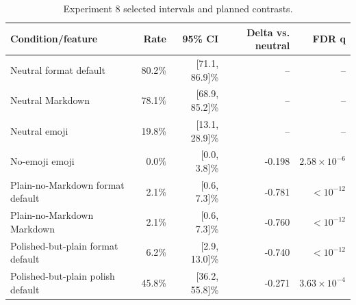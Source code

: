 \begin{table}[t]
\centering
\caption{Experiment 8 selected intervals and planned contrasts.}
\label{tab:exp8-ci-contrast}
\begin{tabular}{lrrrr}
\toprule
Condition/feature & Rate & 95\% CI & Delta vs. neutral & FDR q \\
\midrule
Neutral format default & 80.2\% & [71.1, 86.9]\% & -- & -- \\
Neutral Markdown & 78.1\% & [68.9, 85.2]\% & -- & -- \\
Neutral emoji & 19.8\% & [13.1, 28.9]\% & -- & -- \\
No-emoji emoji & 0.0\% & [0.0, 3.8]\% & -0.198 & $2.58\times10^{-6}$ \\
Plain-no-Markdown format default & 2.1\% & [0.6, 7.3]\% & -0.781 & $<10^{-12}$ \\
Plain-no-Markdown Markdown & 2.1\% & [0.6, 7.3]\% & -0.760 & $<10^{-12}$ \\
Polished-but-plain format default & 6.2\% & [2.9, 13.0]\% & -0.740 & $<10^{-12}$ \\
Polished-but-plain polish default & 45.8\% & [36.2, 55.8]\% & -0.271 & $3.63\times10^{-4}$ \\
\bottomrule
\end{tabular}
\end{table}

